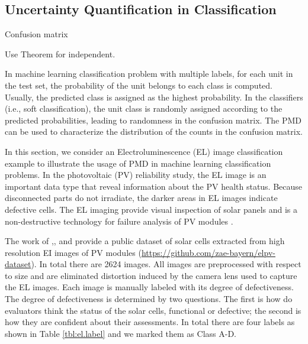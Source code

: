 \documentclass[12pt]{article}
\begin{document}
\subsection{Uncertainty Quantification in Classification}

Confusion matrix

Use Theorem for independent.

In machine learning classification problem with multiple labels, for each unit in the test set, the probability of the unit belongs to each class is computed. Usually, the predicted class is assigned as the highest probability. In the classifiers (i.e., soft classification), the unit class is randomly assigned according to the predicted probabilities, leading to randomness in the confusion matrix. The PMD can be used to characterize the distribution of the counts in the confusion matrix.


%

In this section, we consider an Electroluminescence (EL) image classification example to illustrate the usage of PMD in machine learning classification problems. In the photovoltaic (PV) reliability study, the EL image is an important data type that reveal information about the PV health status. Because disconnected parts do not irradiate, the darker areas in EL images indicate defective cells. The EL imaging provide visual inspection of solar panels and is a non-destructive technology for failure analysis of PV modules .

The work of ,, and  provide a public dataset of solar cells extracted from high resolution EI images of PV modules (\url{https://github.com/zae-bayern/elpv-dataset}). In total there are 2624 images. All images are preprocessed with respect to size and are eliminated distortion induced by the camera lens used to capture the EL images. Each image is manually labeled  with its degree of defectiveness. The degree of defectiveness is determined by two questions. The first is how do evaluators think the status of the solar cells, functional or defective; the second is how they are confident about their assessments. In total there are four labels as shown in Table \ref{tbl:el.label} and we marked them as Class A-D.
\end{document}
